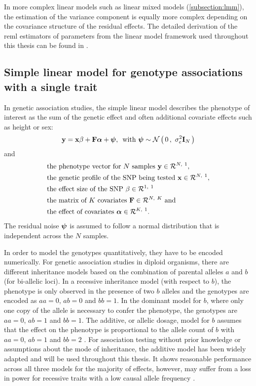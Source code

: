 In more complex linear models such as linear mixed models (\cref{subsection:lmm}), the estimation of the variance component is equally more complex depending on the covariance structure of the residual effects. The detailed derivation of the \gls{reml} estimators of parameters from the linear model framework used  throughout this thesis can be found in \citep[Supplementary material]{Casale2015}. 

\subsection{Simple linear model for genotype associations with a single trait}
\label{subsection:lm-uv}
In genetic association studies, the simple linear model describes the phenotype of interest as the sum of the genetic effect and often additional covariate effects such as height or sex:
\begin{equation}
\boldsymbol{\mathbf{y}} = \boldsymbol{\mathbf{x}}\beta + \boldsymbol{\mathbf{F}}\boldsymbol{\mathbf{\alpha}} + \boldsymbol{\mathbf{\psi}}, \,\text{ with }
\boldsymbol{\mathbf{\psi}} \sim \mathcal{N}\left(\,{0}\,,~{\sigma_e^2\boldsymbol{\mathbf{I}}_{N}}\,\right)
\label{eq:lm-uv}
\end{equation}
%
and
%
\begin{align*} 
& \text{the phenotype vector for $N$ samples } \boldsymbol{\mathbf{y}} \in \mathcal{R}^{N,~1},\\
& \text{the genetic profile of the SNP being tested }\boldsymbol{\mathbf{x}} \in \mathcal{R}^{N,~1},\\
& \text{the effect size of the SNP } \beta \in \mathcal{R}^{1,~1} \\
& \text{the matrix of $K$ covariates }\boldsymbol{\mathbf{F}} \in \mathcal{R}^{N,~K} \text{ and}\\
& \text{the effect of covariates } \boldsymbol{\mathbf{\alpha}} \in \mathcal{R}^{K,~1}.
\end{align*} 
%
The residual noise \(\boldsymbol{\mathbf{\psi}}\) is assumed to follow a normal distribution that is independent across the \(N\) samples.

In order to model the genotypes quantitatively, they have to be encoded numerically. For genetic association studies in diploid organisms, there are different inheritance models based on the combination of parental alleles \(a\) and \(b\) (for bi-allelic loci). In a recessive inheritance model (with respect to \(b\)), the phenotype is only observed in the presence of two \(b\) alleles and the genotypes are encoded as \(aa=0\), \(ab=0\) and \(bb=1\). In the dominant model for \(b\), where only one copy of the allele is necessary to confer the phenotype, the genotypes are \(aa=0\), \(ab=1\) and \(bb=1\). The additive, or allelic dosage, model for \(b\) assumes that the effect on the phenotype is proportional to the allele count of \(b\) with \(aa=0\), \(ab=1\) and \(bb=2\) \citep{Bush2012}. For association testing without prior knowledge or assumptions about the mode of inheritance, the additive model has been widely adapted and will be used throughout this thesis. It shows reasonable performance across all three models for the majority of effects, however, may suffer from a loss in power for recessive traits with a low causal allele frequency \citep{Lettre2007}. 


